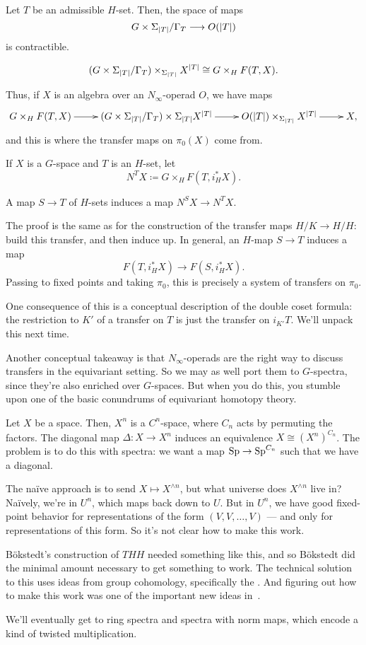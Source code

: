 Let $T$ be an admissible $H$-set. Then, the space of maps
\[G\times\Sigma_{\lvert T\rvert}/\Gamma_T\longrightarrow O(\lvert T\rvert)\]
is contractible.
\begin{lem}
\[(G\times\Sigma_{\lvert T\rvert}/\Gamma_T)\times_{\Sigma_{\lvert T\rvert}} X^{\lvert T\rvert} \cong G\times_H F(T,X).\]
\end{lem}
Thus, if $X$ is an algebra over an $N_\infty$-operad $O$, we have maps
\[\xymatrix{
	G\times_H F(T,X)\ar[r] & (G\times\Sigma_{\abs T}/\Gamma_T)\times\Sigma_{\abs T} X^{\abs T}\ar[r] & O(\abs
	T)\times_{\Sigma_{\abs T}} X^{\abs T}\ar[r] & X,
}\]
and this is where the transfer maps on $\pi_0(X)$ come from.

If $X$ is a $G$-space and $T$ is an $H$-set, let
\[N^TX\coloneqq G\times_H F(T, i_H^*X).\]
\begin{lem}
A map $S\to T$ of $H$-sets induces a map $N^S X\to N^T X$.
\end{lem}
The proof is the same as for the construction of the transfer maps $H/K\to H/H$: build this transfer, and then
induce up. In general, an $H$-map $S\to T$ induces a map
\[F(T, i_H^*X)\longrightarrow F(S, i_H^*X).\]
Passing to fixed points and taking $\pi_0$, this is precisely a system of transfers on $\pi_0$.
\begin{rem}
One consequence of this is a conceptual description of the double coset formula: the restriction to $K'$ of a
transfer on $T$ is just the transfer on $i_{K'}T$. We'll unpack this next time.
\end{rem}
Another conceptual takeaway is that $N_\infty$-operads are the right way to discuss transfers in the equivariant
setting. So we may as well port them to $G$-spectra, since they're also enriched over $G$-spaces. But when you do
this, you stumble upon one of the basic conundrums of equivariant homotopy theory.

Let $X$ be a space. Then, $X^n$ is a $C^n$-space, where $C_n$ acts by permuting the factors. The diagonal map
$\Delta\colon X\to X^n$ induces an equivalence $X\cong (X^n)^{C_n}$. The problem is to do this with spectra: we
want a map $\mathrm{Sp}\to\mathrm{Sp}^{C_n}$ such that we have a diagonal.

The naïve approach is to send $X\mapsto X^{\wedge n}$, but what universe does $X^{\wedge n}$ live in? Naïvely,
we're in $U^n$, which maps back down to $U$. But in $U^n$, we have good fixed-point behavior for representations of
the form $(V,V,\dotsc,V)$ --- and only for representations of this form. So it's not clear how to make this work.

Bökstedt's construction of $\mathit{THH}$ needed something like this, and so Bökstedt did the minimal amount
necessary to get something to work. The technical solution to this uses ideas from group cohomology, specifically
the . And figuring out how to make this work was one of the important new ideas in~\cite{HHR}.

We'll eventually get to ring spectra and spectra with norm maps, which encode a kind of twisted multiplication.

